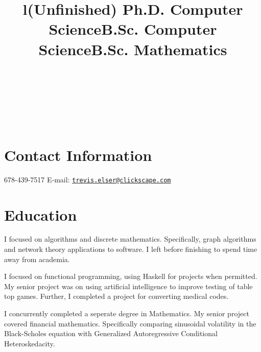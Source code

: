 \documentclass[margintitle,line]{res}
\begin{document}

\begin{resume}

\begin{format}
\\
\title{l}\\
\body\\
\end{format}

\section{Contact Information}

678-439-7517 \hfill {E-mail:} \href{mailto:trevis.elser@clickscape.com}{\nolinkurl{trevis.elser@clickscape.com}} \\

\section{Education}

\title{(Unfinished) Ph.D. Computer Science}
\begin{position}
I focused on algorithms and discrete mathematics. Specifically, graph algorithms and network theory applications to software. I left before finishing to spend time away from academia.
\end{position}

\title{B.Sc. Computer Science}
\begin{position}
I focused on functional programming, using Haskell for projects when permitted. My senior project was on using artificial intelligence to improve testing of table top games. Further, I completed a project for converting medical codes.
\end{position}

\title{B.Sc. Mathematics}
\begin{position}
I concurrently completed a seperate degree in Mathematics. My senior project covered financial mathematics. Specifically comparing sinusoidal volatility in the Black-Scholes equation with Generalized Autoregressive Conditional Heteroskedacity.
\end{position}


\end{resume}
\end{document}
